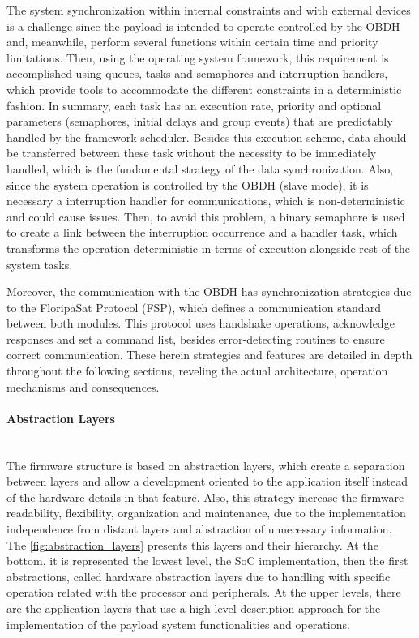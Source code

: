 The system synchronization within internal constraints and with external devices is a challenge since the payload is intended to operate controlled by the OBDH and, meanwhile, perform several functions within certain time and priority limitations. Then, using the operating system framework, this requirement is accomplished using queues, tasks and semaphores and interruption handlers, which provide tools to accommodate the different constraints in a deterministic fashion. In summary, each task has an execution rate, priority and optional parameters (semaphores, initial delays and group events) that are predictably handled by the framework scheduler. Besides this execution scheme, data should be transferred between these task without the necessity to be immediately handled, which is the fundamental strategy of the data synchronization. Also, since the system operation is controlled by the OBDH (slave mode), it is necessary a interruption handler for communications, which is non-deterministic and could cause issues. Then, to avoid this problem, a binary semaphore is used to create a link between the interruption occurrence and a handler task, which transforms the operation deterministic in terms of execution alongside rest of the system tasks. 

Moreover, the communication with the OBDH has synchronization strategies due to the FloripaSat Protocol (FSP), which defines a communication standard between both modules. This protocol uses handshake operations, acknowledge responses and set a command list, besides error-detecting routines to ensure correct communication. 
These herein strategies and features are detailed in depth throughout the following sections, reveling the actual architecture, operation mechanisms and consequences.


\paragraph{Abstraction Layers} \mbox{}\\

The firmware structure is based on abstraction layers, which create a separation between layers and allow a development oriented to the application itself instead of the hardware details in that feature. Also, this strategy increase the firmware readability, flexibility, organization and maintenance, due to the implementation independence from distant layers and abstraction of unnecessary information. The \autoref{fig:abstraction_layers} presents this layers and their hierarchy. At the bottom, it is represented the lowest level, the SoC implementation, then the first abstractions, called hardware abstraction layers due to handling with specific operation related with the processor and peripherals. At the upper levels, there are the application layers that use a high-level description approach for the implementation of the payload system functionalities and operations.  

